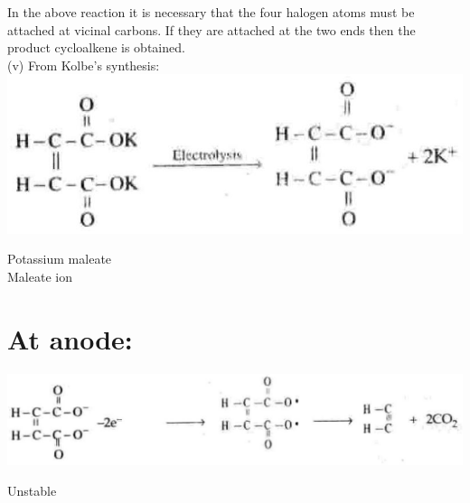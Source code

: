 \documentclass[10pt]{article}
\begin{document}
In the above reaction it is necessary that the four halogen atoms must be attached at vicinal carbons. If they are attached at the two ends then the product cycloalkene is obtained.\\
(v) From Kolbe's synthesis:\\
\includegraphics[max width=\textwidth, center]{2025_01_28_8470952b98110cec3aabg-187(4)}

Potassium maleate\\
Maleate ion

\section*{At anode:}
\begin{center}
\includegraphics[max width=\textwidth]{2025_01_28_8470952b98110cec3aabg-187}
\end{center}

Unstable
\end{document}
